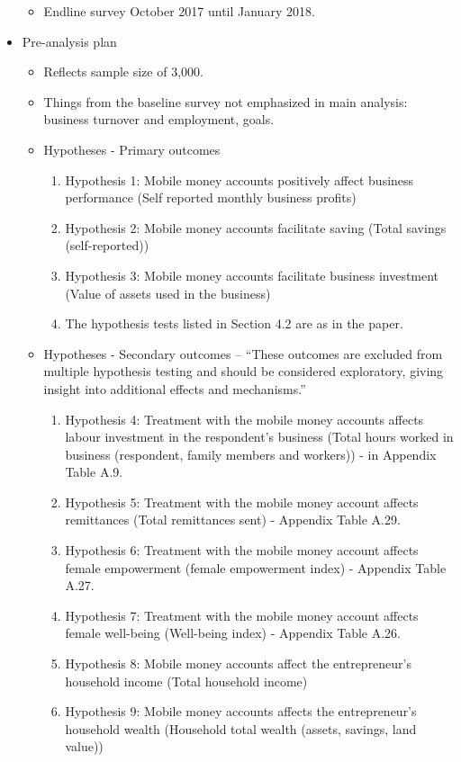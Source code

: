 \documentclass[]{article}
\begin{document}
\begin{itemize}
\begin{itemize}
		\item Endline survey October 2017 until January 2018.
	\end{itemize}
	\item Pre-analysis plan
	\begin{itemize}
		\item Reflects sample size of 3,000.
		\item Things from the baseline survey not emphasized in main analysis: business turnover and employment, goals.
		\item Hypotheses - Primary outcomes
		\begin{enumerate}
			\item Hypothesis 1: Mobile money accounts positively affect business performance (Self reported monthly business profits)
			\item Hypothesis 2: Mobile money accounts facilitate saving (Total savings (self-reported))
			\item Hypothesis 3: Mobile money accounts facilitate business investment (Value of assets used in the business)
			\item The hypothesis tests listed in Section 4.2 are as in the paper.
		\end{enumerate}
	\item Hypotheses - Secondary outcomes -- ``These outcomes are excluded from
	multiple hypothesis testing and should be considered exploratory, giving insight into additional
	effects and mechanisms.''
	\begin{enumerate}
		\item Hypothesis 4: Treatment with the mobile money accounts affects labour investment in the respondent’s business (Total hours worked in business (respondent, family members and
		workers)) - in Appendix Table A.9.
		\item Hypothesis 5: Treatment with the mobile money account affects remittances (Total remittances sent) - Appendix Table A.29.
		\item Hypothesis 6: Treatment with the mobile money account affects female empowerment (female empowerment index) - Appendix Table A.27.
		\item Hypothesis 7: Treatment with the mobile money account affects female well-being (Well-being index) - Appendix Table A.26.
		\item Hypothesis 8: Mobile money accounts affect the entrepreneur’s household income (Total household income)
		\item Hypothesis 9: Mobile money accounts affects the entrepreneur’s household wealth (Household total wealth (assets, savings, land value))

\end{enumerate}
\end{itemize}
\end{itemize}
\end{document}

